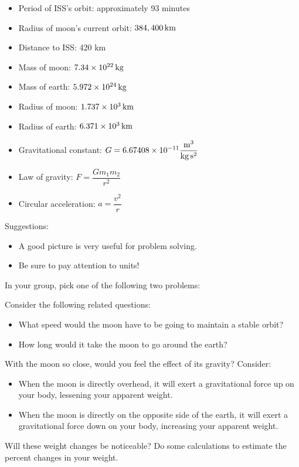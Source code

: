 \documentclass{ximera}
\begin{document}
\begin{problem}
\begin{itemize}
\item Period of ISS's orbit: approximately 93 minutes
\item Radius of moon's current orbit:  $384,400 \, \rm{km}$
\item Distance to ISS: 420 km
\item Mass of moon: $7.34\times 10^{22}\, \rm{kg}$
\item Mass of earth: $5.972\times 10^{24}\, \rm{kg}$
\item Radius of moon: $1.737\times 10^3\, \rm{km}$
\item Radius of earth: $6.371\times 10^3\, \rm{km}$
\item Gravitational constant:  $G = 6.67408\times 10^{-11} \dfrac{\rm{m}^3}{ \rm{kg} \, \rm{ s}^2}$
\item Law of gravity:  $F=\dfrac{Gm_1m_2}{r^2}$
\item Circular acceleration: $a=\dfrac{v^2}{r}$
\end{itemize}

Suggestions:  
\begin{itemize}
\item A good picture is very useful for problem solving.  
\item Be sure to pay attention to units!
\end{itemize}

\end{problem}

\newpage

In your group, pick one of the following two problems:  

\begin{problem}
Consider the following related questions: 
\begin{itemize}
\item What speed would the moon have to be going to maintain a stable orbit? 
\item How long would it take the moon to go around the earth? 
\end{itemize}
  
\end{problem}


\begin{problem}
With the moon so close, would you feel the effect of its gravity?  Consider:  
\begin{itemize}
\item When the moon is directly overhead, it will exert a gravitational force up on your body, lessening your apparent weight.  
\item When the moon is directly on the opposite side of the earth, it will exert a gravitational force down on your body, increasing your apparent weight.  
\end{itemize}
Will these weight changes be noticeable?  Do some calculations to estimate the percent changes in your weight.  
\end{problem}
\end{document}
